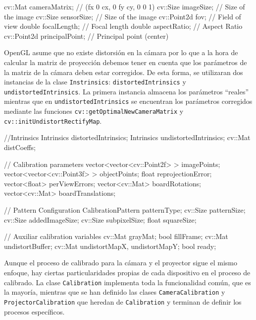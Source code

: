 \begin{listing}[
  float=ht,
  language = C++,
  caption  = {Atributos de la clase Intrinsics},
  label    = code:Intrinsics]
 cv::Mat cameraMatrix;       // (fx 0 cx, 0 fy cy, 0 0 1)
 cv::Size imageSize;         // Size of the image
 cv::Size sensorSize;        // Size of the image
 cv::Point2d fov;            // Field of view
 double focalLength;         // Focal length
 double aspectRatio;         // Aspect Ratio
 cv::Point2d principalPoint; // Principal point (center)
\end{listing}

OpenGL asume que no existe distorsión en la cámara por lo que a la hora de calcular la matriz de proyección debemos tener en cuenta que los parámetros de la matriz de la cámara deben estar corregidos. De esta forma, se utilizaran dos instancias de la clase \texttt{Instrinsics}: \texttt{distortedIntrinsics} y \texttt{undistortedIntrinsics}. La primera instancia almacena los parámetros ``reales'' mientras que en \texttt{undistortedIntrinsics} se encuentran los parámetros corregidos mediante las funciones \texttt{cv::getOptimalNewCameraMatrix} y \texttt{cv::initUndistortRectifyMap}.

\begin{listing}[
  float=ht,
  language = C++,
  caption  = {Atributos de la clase Calibration},
  label    = code:Calibration]
  //Intrinsics
  Intrinsics distortedIntrinsics;
  Intrinsics undistortedIntrinsics;
  cv::Mat distCoeffs;
  
  // Calibration parameters
  vector<vector<cv::Point2f> > imagePoints;
  vector<vector<cv::Point3f> > objectPoints;
  float reprojectionError;
  vector<float> perViewErrors;
  vector<cv::Mat> boardRotations;
  vector<cv::Mat> boardTranslations;

  // Pattern Configuration
  CalibrationPattern patternType;
  cv::Size patternSize;
  cv::Size addedImageSize;
  cv::Size subpixelSize;
  float squareSize;
 
  // Auxiliar calibration variables
  cv::Mat grayMat;
  bool fillFrame;
  cv::Mat undistortBuffer;
  cv::Mat undistortMapX, undistortMapY;
  bool ready;
 \end{listing}

Aunque el proceso de calibrado para la cámara y el proyector sigue el mismo enfoque, hay ciertas particularidades propias de cada dispositivo en el proceso de calibrado. La clase \texttt{Calibration} implementa toda la funcionalidad común, que es la mayoría, mientras que se han definido las clases \texttt{CameraCalibration} y \texttt{ProjectorCalibration} que heredan de \texttt{Calibration} y terminan de definir los procesos específicos.

